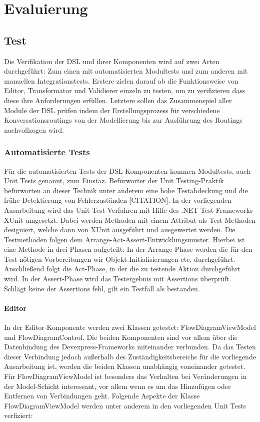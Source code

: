 \chapter{Evaluierung}

\section{Test}
Die Verifikation der DSL und ihrer Komponenten wird auf zwei Arten durchgeführt: Zum einen mit automatisierten Modultests und zum anderen mit manuellen Integrationstests. Erstere zielen darauf ab die Funktionsweise von Editor, Transformator und Validierer einzeln zu testen, um zu verifizieren dass diese ihre Anforderungen erfüllen. Letztere sollen das Zusammenspiel aller Module der DSL prüfen indem der Erstellungsprozess für verschiedene Konversationsroutings von der Modellierung bis zur Ausführung des Routings nachvollzogen wird.

\subsection{Automatisierte Tests}
Für die automatisierten Tests der DSL-Komponenten kommen Modultests, auch Unit Tests genannt, zum Einstaz. Befürworter der Unit Testing-Praktik befürworten an dieser Technik unter anderem eine hohe Testabdeckung und die frühe Detektierung von Fehlerzuständen [CITATION]. In der vorliegenden Ausarbeitung wird das Unit Test-Verfahren mit Hilfe des .NET-Test-Frameworks XUnit umgesetzt. Dabei werden Methoden mit einem Attribut als Test-Methoden designiert, welche dann von XUnit ausgeführt und ausgewertet werden. Die Testmethoden folgen dem Arrange-Act-Assert-Entwicklungsmuster. Hierbei ist eine Methode in drei Phasen aufgeteilt: In der Arrange-Phase werden die für den Test nötigen Vorbereitungen wir Objekt-Initialisierungen etc. durchgeführt. Anschließend folgt die Act-Phase, in der die zu testende Aktion durchgeführt wird. In der Assert-Phase wird das Testergebnis mit Assertions überprüft. Schlägt keine der Assertions fehl, gilt ein Testfall als bestanden.

\subsubsection{Editor}
In der Editor-Komponente werden zwei Klassen getestet: FlowDiagramViewModel und FlowDiagramControl. Die beiden Komponenten sind vor allem über die Datenbindung des Devexpress-Frameworks miteinander verbunden. Da das Testen dieser Verbindung jedoch außerhalb des Zuständigkeitsbereichs für die vorliegende Ausarbeitung ist, werden die beiden Klassen unabhängig voneinander getestet. Für FlowDiagramViewModel ist besonders das Verhalten bei Veränderungen in der Model-Schicht interessant, vor allem wenn es um das Hinzufügen oder Entfernen von Verbindungen geht. Folgende Aspekte der Klasse FlowDiagramViewModel werden unter anderem in den vorliegenden Unit Tests verfiziert: 

